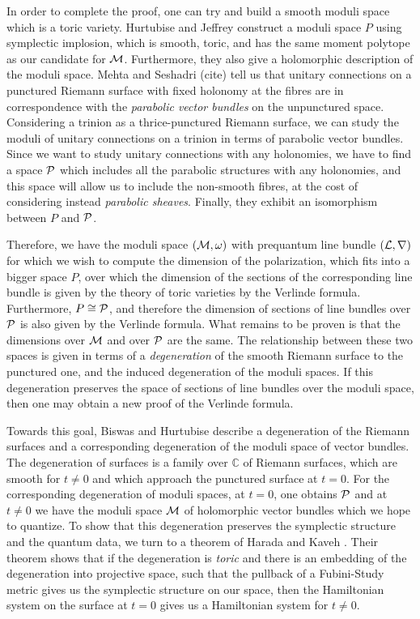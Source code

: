 	In order to complete the proof, one can try and build a smooth moduli space which is a toric variety. Hurtubise and Jeffrey \cite{hurtubise_moduli_2005}\cite{hurtubise_representations_2000} construct a moduli space $P$ using symplectic implosion, which is smooth, toric, and has the same moment polytope as our candidate for $\mathcal{M}$. Furthermore, they also give a holomorphic description of the moduli space. Mehta and Seshadri (cite) tell us that unitary connections on a punctured Riemann surface with fixed holonomy at the fibres are in correspondence with the \textit{parabolic vector bundles} on the unpunctured space. Considering a trinion as a thrice-punctured Riemann surface, we can study the moduli of unitary connections on a trinion in terms of parabolic vector bundles. Since we want to study unitary connections with any holonomies, we have to find a space $\mathcal{P}$ which includes all the parabolic structures with any holonomies, and this space will allow us to include the non-smooth fibres, at the cost of considering instead \emph{parabolic sheaves}. Finally, they exhibit an isomorphism between $P$ and $\mathcal{P}$.
	
	Therefore, we have the moduli space $(\mathcal{M},\omega)$ with prequantum line bundle $(\mathcal{L},\nabla)$ for which we wish to compute the dimension of the polarization, which fits into a bigger space $P$, over which the dimension of the sections of the corresponding line bundle is given by the theory of toric varieties by the Verlinde formula. Furthermore, $P \cong \mathcal{P}$, and therefore the dimension of sections of line bundles over $\mathcal{P}$ is also given by the Verlinde formula. What remains to be proven is that the dimensions over $\mathcal{M}$ and over $\mathcal{P}$ are the same. The relationship between these two spaces is given in terms of a \textit{degeneration} of the smooth Riemann surface to the punctured one, and the induced degeneration of the moduli spaces. If this degeneration preserves the space of sections of line bundles over the moduli space, then one may obtain a new proof of the Verlinde formula. 
	
	Towards this goal, Biswas and Hurtubise \cite{biswas_degenerations_2021} describe a degeneration of the Riemann surfaces and a corresponding degeneration of the moduli space of vector bundles. The degeneration of surfaces is a family over $\mathbb{C}$ of Riemann surfaces, which are smooth for $t\neq0$ and which approach the punctured surface at $t=0$. For the corresponding degeneration of moduli spaces, at $t=0$, one obtains $\mathcal{P}$ and at $t\neq 0$ we have the moduli space $\mathcal{M}$ of holomorphic vector bundles which we hope to quantize. To show that this degeneration preserves the symplectic structure and the quantum data, we turn to a theorem of Harada and Kaveh \cite{harada_integrable_2015}. Their theorem shows that if the degeneration is \textit{toric} and there is an embedding of the degeneration into projective space, such that the pullback of a Fubini-Study metric gives us the symplectic structure on our space, then the Hamiltonian system on the surface at $t=0$ gives us a Hamiltonian system for $t\neq 0$. 
	

